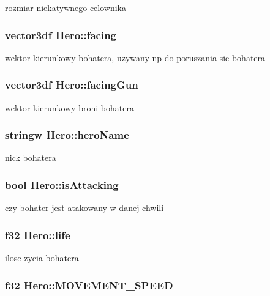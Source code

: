 rozmiar niekatywnego celownika \hypertarget{class_hero_a82afd40685996ca4de51159be95264d9}{
\subsubsection[{facing}]{\setlength{\rightskip}{0pt plus 5cm}vector3df {\bf Hero::facing}}}
\label{class_hero_a82afd40685996ca4de51159be95264d9}
wektor kierunkowy bohatera, uzywany np do poruszania sie bohatera \hypertarget{class_hero_abbb623e457418c1430c8838b46381166}{
\subsubsection[{facingGun}]{\setlength{\rightskip}{0pt plus 5cm}vector3df {\bf Hero::facingGun}}}
\label{class_hero_abbb623e457418c1430c8838b46381166}
wektor kierunkowy broni bohatera \hypertarget{class_hero_aaedb868881c5a1a38d862dade0e6e030}{
\subsubsection[{heroName}]{\setlength{\rightskip}{0pt plus 5cm}stringw {\bf Hero::heroName}}}
\label{class_hero_aaedb868881c5a1a38d862dade0e6e030}
nick bohatera \hypertarget{class_hero_aa1b8ba4fd9f005df0339019a4aea4727}{
\subsubsection[{isAttacking}]{\setlength{\rightskip}{0pt plus 5cm}bool {\bf Hero::isAttacking}}}
\label{class_hero_aa1b8ba4fd9f005df0339019a4aea4727}
czy bohater jest atakowany w danej chwili \hypertarget{class_hero_a6ab09c62a1129609420943ddaea4ac50}{
\subsubsection[{life}]{\setlength{\rightskip}{0pt plus 5cm}f32 {\bf Hero::life}}}
\label{class_hero_a6ab09c62a1129609420943ddaea4ac50}
ilosc zycia bohatera \hypertarget{class_hero_aa56f0d2e5320927be5043d0f43c48c0e}{
\subsubsection[{MOVEMENT\_\-SPEED}]{\setlength{\rightskip}{0pt plus 5cm}f32 {\bf Hero::MOVEMENT\_\-SPEED}}}
